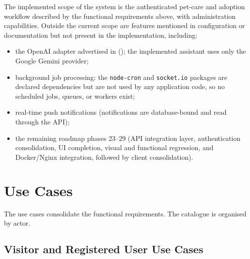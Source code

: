 The implemented scope of the system is the authenticated pet-care and adoption
workflow described by the functional requirements above, with administration
capabilities. Outside the current scope are features mentioned in configuration
or documentation but not present in the implementation, including:

\begin{itemize}
    \item the OpenAI adapter advertised in 
    (); the implemented assistant uses only the
    Google Gemini provider;
    \item background job processing: the \texttt{node-cron} and
    \texttt{socket.io} packages are declared dependencies but are not used by any
    application code, so no scheduled jobs, queues, or workers exist;
    \item real-time push notifications (notifications are database-bound and
    read through the API);
    \item the remaining roadmap phases 23--29 (API integration layer,
    authentication consolidation, UI completion, visual and functional
    regression, and Docker/Nginx integration, followed by
    client consolidation).
\end{itemize}

\section{Use Cases}

The use cases consolidate the functional requirements. The catalogue is organised
by actor.

\subsection{Visitor and Registered User Use Cases}

